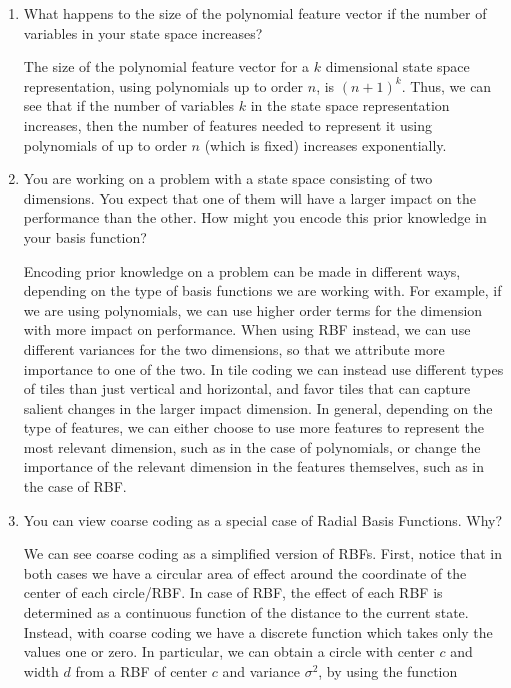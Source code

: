 \documentclass{exam}
\begin{document}
\begin{problem}
\begin{enumerate}
\begin{solutionorlines}[2in]
            \end{solutionorlines}
    \item What happens to the size of the polynomial feature vector if the number of variables in your state space increases?
            \begin{solutionorlines}[2in]
                The size of the polynomial feature vector for a $k$ dimensional state space representation, using polynomials up to order $n$, is $(n+1)^k$. Thus, we can see that if the number of variables $k$ in the state space representation increases, then the number of features needed to represent it using polynomials of up to order $n$ (which is fixed) increases exponentially.
            \end{solutionorlines}
    \item You are working on a problem with a state space consisting of two dimensions. You expect that one of them will have a larger impact on the performance than the other. How might you encode this prior knowledge in your basis function?
            \begin{solutionorlines}[2in]
                Encoding prior knowledge on a problem can be made in different ways, depending on the type of basis functions we are working with. For example, if we are using polynomials, we can use higher order terms for the dimension with more impact on performance. When using RBF instead, we can use different variances for the two dimensions, so that we attribute more importance to one of the two. In tile coding we can instead use different types of tiles than just vertical and horizontal, and favor tiles that can capture salient changes in the larger impact dimension. In general, depending on the type of features, we can either choose to use more features to represent the most relevant dimension, such as in the case of polynomials, or change the importance of the relevant dimension in the features themselves, such as in the case of RBF.
            \end{solutionorlines}
    \item You can view coarse coding as a special case of Radial Basis Functions. Why?
            \begin{solutionorlines}[2in]
                We can see coarse coding as a simplified version of RBFs. First, notice that in both cases we have a circular area of effect around the coordinate of the center of each circle/RBF. In case of RBF, the effect of each RBF is determined as a continuous function of the distance to the current state. Instead, with coarse coding we have a discrete function which takes only the values one or zero. In particular, we can obtain a circle with center $c$ and width $d$ from a RBF of center $c$ and variance $\sigma^2$, by using the function
                

\end{solutionorlines}
\end{enumerate}
\end{problem}
\end{document}
